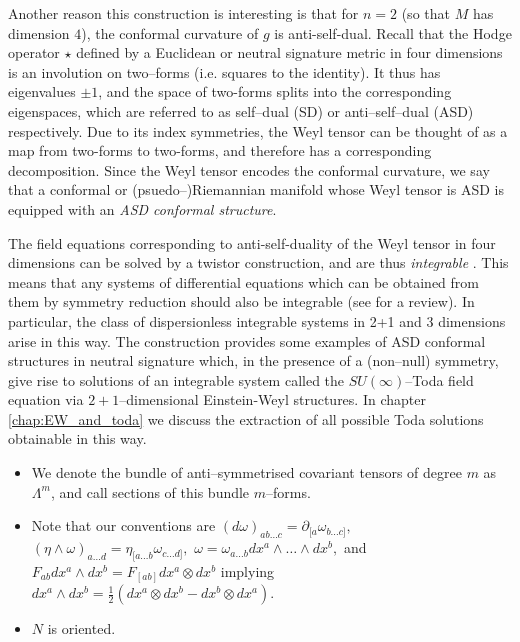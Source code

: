 Another reason this construction is interesting is that for $n=2$ (so that $M$ has dimension $4$), the conformal
curvature of $g$ is anti-self-dual. Recall that the Hodge operator
$\star$ defined by a Euclidean or neutral signature metric in four
dimensions is an involution on two--forms (i.e. squares to the identity).
It thus has eigenvalues $\pm1$, and the space of two-forms splits
into the corresponding eigenspaces, which are referred to as self--dual
(SD) or anti--self--dual (ASD) respectively. Due to its index symmetries,
the Weyl tensor can be thought of as a map from two-forms to two-forms,
and therefore has a corresponding decomposition. Since the Weyl tensor
encodes the conformal curvature, we say that a conformal or (psuedo--)Riemannian
manifold whose Weyl tensor is ASD is equipped with an \textit{ASD
conformal structure}.

The field equations corresponding to anti-self-duality of the Weyl
tensor in four dimensions can be solved by a twistor construction,
and are thus \textit{integrable} \cite{ward}. This means that any systems of differential
equations which can be obtained from them by symmetry reduction should
also be integrable (see \cite{MW} for a review). In particular, the class of dispersionless
integrable systems in 2+1 and 3 dimensions arise in this way. The
construction \cite{DM} provides some examples of
ASD conformal structures in neutral signature which, in the presence
of a (non--null) symmetry, give rise to solutions of an integrable
system called the $SU(\infty)$--Toda field equation via $2+1$--dimensional
Einstein-Weyl structures. In chapter \ref{chap:EW_and_toda} we discuss the extraction
of all possible Toda solutions obtainable in this way.

\begin{itemize}
\item We denote the bundle of anti--symmetrised covariant tensors of degree $m$ as $\Lambda^m$, and call sections of this bundle $m$--forms.
\item Note that our conventions are $(d\omega)_{ab\dots c}=\partial_{[a}\omega_{b\dots c]},$
$(\eta\wedge\omega)_{a\dots d}=\eta_{[a\dots b}\omega_{c\dots d]},$
$\omega=\omega_{a\dots b}dx^{a}\wedge\dots\wedge dx^{b},$
and $F_{ab}{d}x^{a}\wedge{d}x^{b}=F_{[ab]}{d}x^{a}\otimes{d}x^{b}$
implying ${d}x^{a}\wedge{d}x^{b}=\frac{1}{2}({d}x^{a}\otimes{d}x^{b}-{d}x^{b}\otimes{d}x^{a})$.
\item $N$ is oriented. 
\end{itemize}

